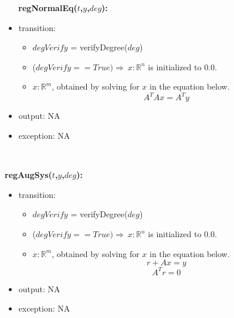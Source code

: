 \documentclass[12pt, titlepage]{article}
\begin{document}
~\newline
~\newline
\noindent \textbf{regNormalEq($t$,$y$,$deg$):}
\begin{itemize}
	\item transition: 
	\begin{itemize}
		\item $degVerify$ = verifyDegree($deg$)
		\item ($degVerify == True) \Longrightarrow\  x : \mathbb{R}^n$ is 
		initialized to $0.0$.
		\item $x : \mathbb{R}^m$, obtained by solving for $x$ in the 
		equation below.
		\begin{equation*}
		A^{T} Ax = A^{T}y
		\end{equation*}  
	\end{itemize} 
	\item output: NA
	\item exception: NA
\end{itemize}

~\newline
~\newline

\noindent \textbf{regAugSys($t$,$y$,$deg$):}
\begin{itemize}
\item transition: 
\begin{itemize}
	\item $degVerify$ = verifyDegree($deg$)
	\item ($degVerify == True) \Longrightarrow\  x : \mathbb{R}^n$ is 
	initialized to 0.0. 
	\item $x : \mathbb{R}^m$, obtained by solving for $x$ in the 
	equation below.
		\begin{equation*}
		r + Ax = y
		\end{equation*}
		\begin{equation*}
		A^{T} r = 0
		\end{equation*}
	\end{itemize}	
	\item output: NA 
		
	\item exception: NA
\end{itemize}
\end{document}
